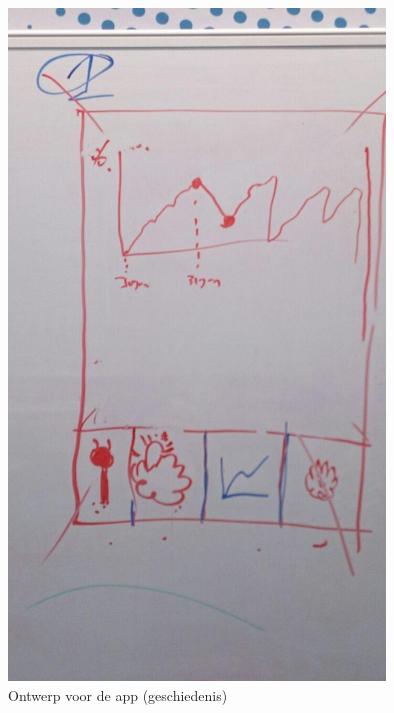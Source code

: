 \begin{figure}[htbp]
\centering
\includegraphics[width=10cm]{images/html_idee_3.jpg}
\caption{Ontwerp voor de app (geschiedenis)}\label{fig:html_idee_3}
\end{figure}